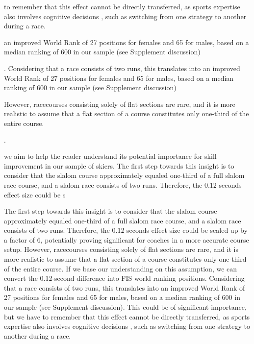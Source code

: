 \documentclass{article}
\begin{document}
to remember that this effect cannot be directly transferred, as sports expertise also involves cognitive decisions \cite{mangalam_investigating_2023, krakauer_motor_2019}, such as switching from one strategy to another during a race.


an improved World Rank of 27 positions for females and 65 for males, based on a median ranking of 600 in our sample (see Supplement discussion)



. Considering that a race consists of two runs, this translates into an improved World Rank of 27 positions for females and 65 for males, based on a median ranking of 600 in our sample (see Supplement discussion)




However, racecourses consisting solely of flat sections are rare, and it is more realistic to assume that a flat section of a course constitutes only one-third of the entire course.

.





we aim to help the reader understand its potential importance for skill improvement in our sample of skiers. The first step towards this insight is to consider that the slalom course approximately equaled one-third of a full slalom race course, and a slalom race consists of two runs. Therefore, the 0.12 seconds effect size could be s



The first step towards this insight is to consider that the slalom course approximately equaled one-third of a full slalom race course, and a slalom race consists of two runs. Therefore, the 0.12 seconds effect size could be scaled up by a factor of 6, potentially proving significant for coaches in a more accurate course setup. However, racecourses consisting solely of flat sections are rare, and it is more realistic to assume that a flat section of a course constitutes only one-third of the entire course. If we base our understanding on this assumption, we can convert the 0.12-second difference into FIS world ranking positions. Considering that a race consists of two runs, this translates into an improved World Rank of 27 positions for females and 65 for males, based on a median ranking of 600 in our sample (see Supplement discussion). This could be of significant importance, but we have to remember that this effect cannot be directly transferred, as sports expertise also involves cognitive decisions \cite{mangalam_investigating_2023, krakauer_motor_2019}, such as switching from one strategy to another during a race.
\end{document}
